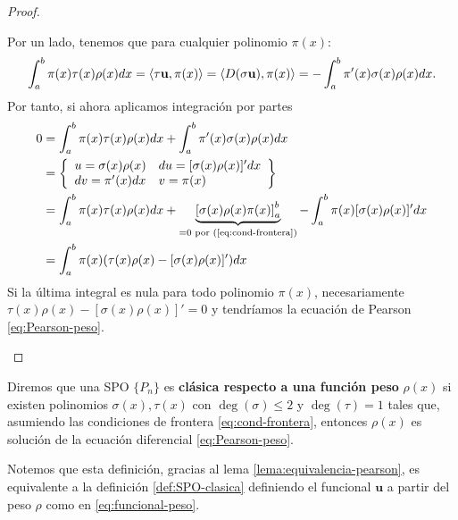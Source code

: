 \begin{proof}
\begin{itemize}
        Por un lado, tenemos que para cualquier polinomio $\pi(x)$:
        $$
        \int_a^b \pi(x)\tau(x)\rho(x)dx = \left\langle \tau \mathbf{u} , \pi(x) \right\rangle= \left\langle D(\sigma \mathbf{u}) , \pi(x) \right\rangle = -\int_a^b \pi'(x) \sigma(x)\rho(x) dx.
        $$
        Por tanto, si ahora aplicamos integración por partes
        \begin{equation*}
            \begin{split}
                0 &= \int_a^b \pi(x)\tau(x)\rho(x)dx + \int_a^b \pi'(x) \sigma(x)\rho(x) dx \\
                &= \left\{\begin{array}{ll}
                    u = \sigma(x)\rho(x) & du=[\sigma(x)\rho(x)]'dx \\
                    dv = \pi'(x) dx & v = \pi(x)
                \end{array}\right\} \\
                &= \int_a^b \pi(x)\tau(x)\rho(x)dx + \underbrace{\left[\sigma(x)\rho(x)\pi(x)\right]_a^b}_{=0\text{ por (\ref{eq:cond-frontera})}} - \int_a^b \pi(x)[\sigma(x)\rho(x)]'dx \\
                &= \int_a^b \pi(x)(\tau(x)\rho(x) - [\sigma(x)\rho(x)]' )dx
            \end{split}
        \end{equation*}
        Si la última integral es nula para todo polinomio $\pi(x)$, necesariamente $\tau(x)\rho(x) - [\sigma(x)\rho(x)]' =0$ y tendríamos la ecuación de Pearson \eqref{eq:Pearson-peso}.
    \end{itemize}
    
    
\end{proof}

\begin{definicion}
    Diremos que una SPO $\{P_n\}$ es \textbf{clásica respecto a una función peso} $\rho(x)$ si existen polinomios $\sigma(x),\tau(x)$ con $\deg(\sigma)\leq 2$ y $\deg(\tau)=1$ tales que, asumiendo las condiciones de frontera \eqref{eq:cond-frontera}, entonces $\rho(x)$ es solución de la ecuación diferencial \eqref{eq:Pearson-peso}.
\end{definicion}

Notemos que esta definición, gracias al lema \ref{lema:equivalencia-pearson}, es equivalente a la definición \ref{def:SPO-clasica} definiendo el funcional $\mathbf{u}$ a partir del peso $\rho$ como en \eqref{eq:funcional-peso}.


